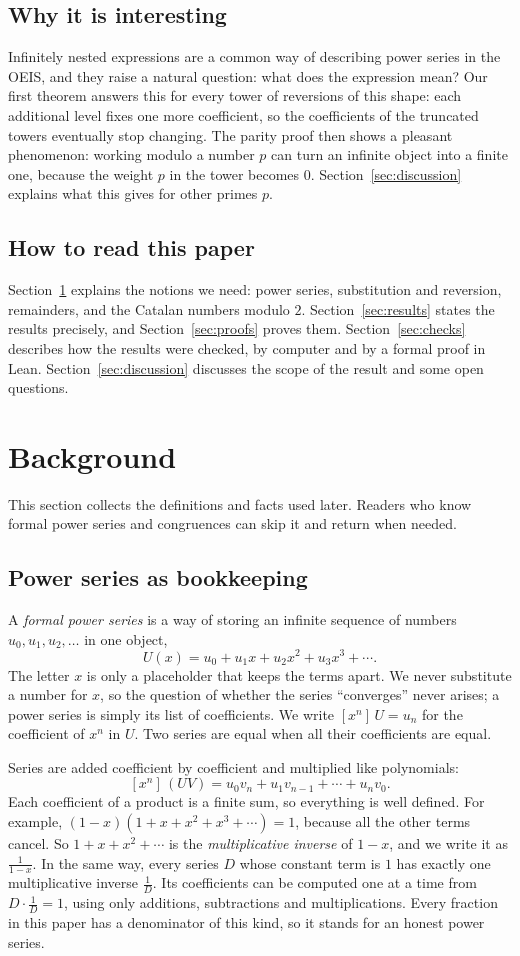 \documentclass[11pt,a4paper]{article}
\theoremstyle{definition}
\theoremstyle{remark}
\newcommand{\coeff}[2]{[x^{#1}]\,#2}
\begin{document}
\subsection{Why it is interesting}
Infinitely nested expressions are a common way of describing power series in the OEIS, and they raise a natural
question: what does the expression mean? Our first theorem answers this for every tower of reversions of this shape: each
additional level fixes one more coefficient, so the coefficients of the truncated towers eventually stop changing. The
parity proof then shows a pleasant phenomenon: working modulo a number $p$ can turn an infinite object into a finite one,
because the weight $p$ in the tower becomes $0$. Section~\ref{sec:discussion} explains what this gives for other primes
$p$.

\subsection{How to read this paper}
Section~\ref{sec:background} explains the notions we need: power series, substitution and reversion, remainders, and the
Catalan numbers modulo $2$. Section~\ref{sec:results} states the results precisely, and Section~\ref{sec:proofs} proves
them. Section~\ref{sec:checks} describes how the results were checked, by computer and by a formal proof in Lean.
Section~\ref{sec:discussion} discusses the scope of the result and some open questions.
\section{Background}\label{sec:background}
This section collects the definitions and facts used later. Readers who know formal power series and congruences can skip it and return when needed.
\subsection{Power series as bookkeeping}
A \emph{formal power series} is a way of storing an infinite sequence of numbers $u_0,u_1,u_2,\dots$ in one object,
\[
U(x)=u_0+u_1x+u_2x^2+u_3x^3+\cdots .
\]
The letter $x$ is only a placeholder that keeps the terms apart. We never substitute a number for $x$, so the question
of whether the series ``converges'' never arises; a power series is simply its list of coefficients. We write
$\coeff{n}{U}=u_n$ for the coefficient of $x^n$ in $U$. Two series are equal when all their coefficients are equal.

Series are added coefficient by coefficient and multiplied like polynomials:
\[
\coeff{n}{(UV)}=u_0v_n+u_1v_{n-1}+\cdots+u_nv_0 .
\]
Each coefficient of a product is a finite sum, so everything is well defined. For example,
$(1-x)(1+x+x^2+x^3+\cdots)=1$, because all the other terms cancel. So $1+x+x^2+\cdots$ is the
\emph{multiplicative inverse} of $1-x$, and we write it as $\frac{1}{1-x}$. In the same way, every series $D$ whose
constant term is $1$ has exactly one multiplicative inverse $\frac1D$. Its coefficients can be computed one at a time
from $D\cdot\frac1D=1$, using only additions, subtractions and multiplications. Every fraction in this paper has a
denominator of this kind, so it stands for an honest power series.
\end{document}
